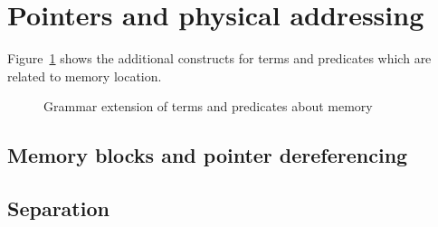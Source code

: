\subsection{}
\label{sec:specmodules}
\nodiff


\section{Pointers and physical addressing}
\label{sec:pointers}

\nodiff

Figure~\ref{fig:gram:memory} shows the additional constructs for terms and
predicates which are related to memory location.
\begin{figure}[htbp]
  \caption{Grammar extension of terms and predicates about memory}
\label{fig:gram:memory}
\end{figure}


\subsection{Memory blocks and pointer dereferencing}
\label{subsec:memory}
\label{sec:memory} %
\nodiff



\subsection{Separation}\label{sec:separation}
\nodiff



